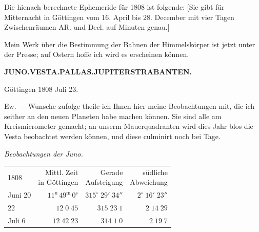 \par\indent Die hienach berechnete Ephemeride für 1808 ist folgende: [Sie gibt für Mitternacht in
Göttingen vom 16. April bis 28. December mit vier Tagen Zwischenräumen AR. und Decl. auf
Minuten genau.]

\par\indent Mein Werk über die Bestimmung der Bahnen der Himmelskörper ist jetzt unter der Presse; auf
Ostern hoffe ich wird es erscheinen können.

\par\endgroup
\clearpage
\thispagestyle{empty}
\noindent{}%
\makebox[12mm][l]{}%
\parbox[t]{\dimexpr\linewidth-24mm\relax}{\centering\footnotesize\bfseries JUNO.\enspace VESTA.\enspace PALLAS.\enspace JUPITERSTRABANTEN.\par}%
\par\nobreak\medskip
\begin{flushright}
Göttingen 1808 Juli 23.
\end{flushright}

\par\indent Ew. --- Wunsche zufolge theile ich Ihnen hier meine Beobachtungen mit, die ich seither an
den neuen Planeten habe machen können. Sie sind alle am Kreismicrometer gemacht; an unserm
Mauerquadranten wird dies Jahr blos die Vesta beobachtet werden können, und diese culminirt
noch bei Tage.

\begin{center}\emph{Beobachtungen der Juno.}\end{center}

\begin{center}\fontsize{10}{12}\selectfont\setlength{\tabcolsep}{3pt}\renewcommand{\arraystretch}{1.15}\begin{tabular}{lrrr}
1808 & \shortstack{Mittl. Zeit\\in Göttingen} & \shortstack{Gerade\\Aufsteigung} & \shortstack{südliche\\Abweichung}\\
Juni 20 & $11^{\text{u}}\,49^{\text{m}}\,0^{\text{s}}$ & $315^\circ\;29'\;34''$ & $2^\circ\;16'\;23''$\\
22 & $12\;0\;45$ & $315\;23\;1$ & $2\;14\;29$\\
Juli 6 & $12\;42\;23$ & $314\;1\;0$ & $2\;19\;7$\\
\end{tabular}\end{center}

